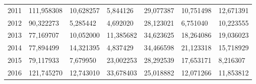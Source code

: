 \begin{table}
\begin{tabular}{p{1cm}p{2cm}p{2cm}p{2cm}p{2cm}p{2cm}p{2cm}}
 2011 &               111,958308 & 10,628257 &                            5,844126 &                      29,077387 &                      10,751498 &         12,671391 \\
 2012 &                90,322273 &  5,285442 &                            4,692020 &                      28,123021 &                       6,751040 &         10,223555 \\
 2013 &                77,169707 & 10,052000 &                           11,385682 &                      34,623625 &                      18,264086 &         19,036023 \\
 2014 &                77,894499 & 14,321395 &                            4,837429 &                      34,466598 &                      21,123318 &         15,718929 \\
 2015 &                79,117933 &  7,679950 &                           23,002253 &                      28,292539 &                      17,653171 &          8,216307 \\
 2016 &               121,745270 & 12,743010 &                           33,678403 &                      25,018882 &                      12,071266 &         11,853812 \\
\bottomrule
\end{tabular}
\end{table}
